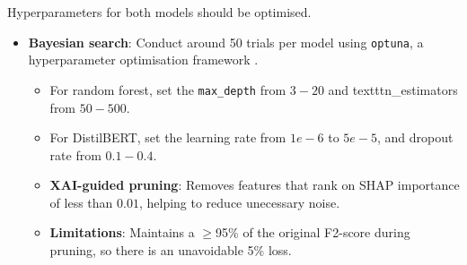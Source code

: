 \noindent Hyperparameters for both models should be optimised.

\begin{itemize}
  \item \textbf{Bayesian search}: Conduct around 50 trials per model using \texttt{optuna}, a hyperparameter optimisation framework \citep{optuna2025}. 
  \begin{itemize}
    \item For random forest, set the \texttt{max\_depth} from $3 - 20$ and texttt{n\_estimators} from $50 - 500$.
    \item For DistilBERT, set the learning rate from $1e - 6$ to $5e - 5$, and dropout rate from $0.1 - 0.4$.
  \item \textbf{XAI-guided pruning}: Removes features that rank on SHAP importance of less than $0.01$, helping to reduce unecessary noise.
  \item \textbf{Limitations}: Maintains a $\geq$95\% of the original F2-score during pruning, so there is an unavoidable 5\% loss.
  \end{itemize}
\end{itemize}

